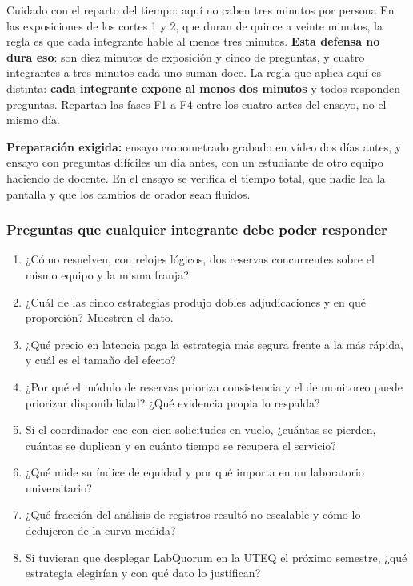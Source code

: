 \documentclass[11pt,a4paper]{article}
\begin{document}
	\begin{avisoBox}{Cuidado con el reparto del tiempo: aquí no caben tres minutos por persona}
		En las exposiciones de los cortes 1 y 2, que duran de quince a veinte minutos, la regla es que cada integrante hable al menos tres minutos. \textbf{Esta defensa no dura eso}: son diez minutos de exposición y cinco de preguntas, y cuatro integrantes a tres minutos cada uno suman doce. La regla que aplica aquí es distinta: \textbf{cada integrante expone al menos dos minutos} y todos responden preguntas. Repartan las fases F1 a F4 entre los cuatro antes del ensayo, no el mismo día.
	\end{avisoBox}
	
	\textbf{Preparación exigida:} ensayo cronometrado grabado en vídeo dos días antes, y ensayo con preguntas difíciles un día antes, con un estudiante de otro equipo haciendo de docente. En el ensayo se verifica el tiempo total, que nadie lea la pantalla y que los cambios de orador sean fluidos.
	
	\subsubsection{Preguntas que cualquier integrante debe poder responder}
	
	\begin{enumerate}[leftmargin=*,itemsep=3pt]
		\item ¿Cómo resuelven, con relojes lógicos, dos reservas concurrentes sobre el mismo equipo y la misma franja?
		\item ¿Cuál de las cinco estrategias produjo dobles adjudicaciones y en qué proporción? Muestren el dato.
		\item ¿Qué precio en latencia paga la estrategia más segura frente a la más rápida, y cuál es el tamaño del efecto?
		\item ¿Por qué el módulo de reservas prioriza consistencia y el de monitoreo puede priorizar disponibilidad? ¿Qué evidencia propia lo respalda?
		\item Si el coordinador cae con cien solicitudes en vuelo, ¿cuántas se pierden, cuántas se duplican y en cuánto tiempo se recupera el servicio?
		\item ¿Qué mide su índice de equidad y por qué importa en un laboratorio universitario?
		\item ¿Qué fracción del análisis de registros resultó no escalable y cómo lo dedujeron de la curva medida?
		\item Si tuvieran que desplegar LabQuorum en la UTEQ el próximo semestre, ¿qué estrategia elegirían y con qué dato lo justifican?
	\end{enumerate}
	
\end{document}
